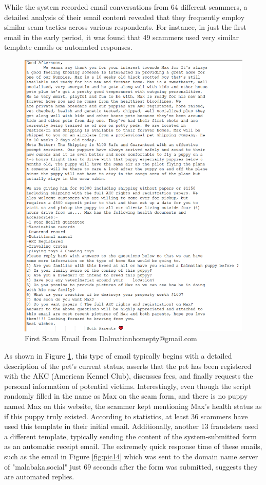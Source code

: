 \documentclass[ oneside,%
                    author={Cassie Qing Tang},
                    degree={BSc},
                     title={An Automated Response System for Disrupting Online Pet Scamming \\ },
                    subtitle={ }]{dissertation}
\begin{document}
While the system recorded email conversations from 64 different scammers, a detailed analysis of their email content revealed that they frequently employ similar scam tactics across various respondents. For instance, in just the first email in the early period, it was found that 49 scammers used very similar template emails or automated responses.
\begin{figure}[H]
\centering
\includegraphics[width=0.7\linewidth]{pic/figure13.png}
\caption{First Scam Email from Dalmatianhomepty@gmail.com}
\label{fig:pic13}
\end{figure}
As shown in Figure \ref{fig:pic13}, this type of email typically begins with a detailed description of the pet's current status, asserts that the pet has been registered with the AKC (American Kennel Club), discusses fees, and finally requests the personal information of potential victims. Interestingly, even though the script randomly filled in the name as Max on the scam form, and there is no puppy named Max on this website, the scammer kept mentioning Max's health status as if this puppy truly existed. According to statistics, at least 36 scammers have used this template in their initial email. Additionally, another 13 fraudsters used a different template, typically sending the content of the system-submitted form as an automatic receipt email. The extremely quick response time of these emails, such as the email in Figure \ref{fig:pic14} which was sent to the domain name server of "malabaka.social" just 69 seconds after the form was submitted, suggests they are automated replies.
\end{document}
